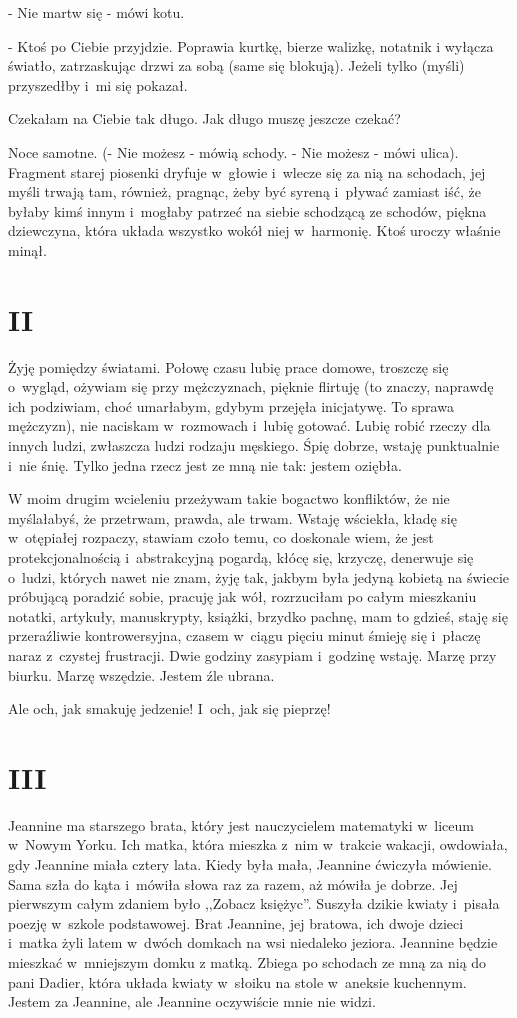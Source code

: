 \documentclass[oneside,polish,12pt,sfheadings]{mwbk}
\begin{document}
- Nie martw się - mówi kotu.

- Ktoś po Ciebie przyjdzie. Poprawia kurtkę, bierze walizkę, notatnik
i wyłącza światło, zatrzaskując drzwi za sobą (same się blokują).
Jeżeli tylko (myśli) przyszedłby i~mi się pokazał.

Czekałam na Ciebie tak długo. Jak długo muszę jeszcze czekać?

Noce samotne. (- Nie możesz - mówią schody. - Nie możesz - mówi ulica).
Fragment starej piosenki dryfuje w~głowie i~wlecze się za nią na schodach,
jej myśli trwają tam, również, pragnąc, żeby być syreną i~pływać zamiast
iść, że byłaby kimś innym i~mogłaby patrzeć na siebie schodzącą ze
schodów, piękna dziewczyna, która układa wszystko wokół niej w~harmonię.
Ktoś uroczy właśnie minął.

\chapter{II}

Żyję pomiędzy światami. Połowę czasu lubię prace domowe, troszczę
się o~wygląd, ożywiam się przy mężczyznach, pięknie flirtuję (to znaczy,
naprawdę ich podziwiam, choć umarłabym, gdybym przejęła inicjatywę.
To sprawa mężczyzn), nie naciskam w~rozmowach i~lubię gotować. Lubię
robić rzeczy dla innych ludzi, zwłaszcza ludzi rodzaju męskiego. Śpię
dobrze, wstaję punktualnie i~nie śnię. Tylko jedna rzecz jest ze mną
nie tak: jestem oziębła.

W moim drugim wcieleniu przeżywam takie bogactwo konfliktów, że nie
myślałabyś, że przetrwam, prawda, ale trwam. Wstaję wściekła, kładę
się w~otępiałej rozpaczy, stawiam czoło temu, co doskonale wiem, że
jest protekcjonalnością i~abstrakcyjną pogardą, kłócę się, krzyczę,
denerwuje się o~ludzi, których nawet nie znam, żyję tak, jakbym była
jedyną kobietą na świecie próbującą poradzić sobie, pracuję jak wół,
rozrzuciłam po całym mieszkaniu notatki, artykuły, manuskrypty, książki,
brzydko pachnę, mam to gdzieś, staję się przeraźliwie kontrowersyjna,
czasem w~ciągu pięciu minut śmieję się i~płaczę naraz z~czystej frustracji.
Dwie godziny zasypiam i~godzinę wstaję. Marzę przy biurku. Marzę wszędzie.
Jestem źle ubrana.

Ale och, jak smakuję jedzenie! I~och, jak się pieprzę!

\chapter{III}

Jeannine ma starszego brata, który jest nauczycielem matematyki w~liceum w~Nowym Yorku. Ich matka, która mieszka z~nim w~trakcie wakacji,
owdowiała, gdy Jeannine miała cztery lata. Kiedy była mała, Jeannine
ćwiczyła mówienie. Sama szła do kąta i~mówiła słowa raz za razem,
aż mówiła je dobrze. Jej pierwszym całym zdaniem było ,,Zobacz księżyc''.
Suszyła dzikie kwiaty i~pisała poezję w~szkole podstawowej. Brat Jeannine,
jej bratowa, ich dwoje dzieci i~matka żyli latem w~dwóch domkach na
wsi niedaleko jeziora. Jeannine będzie mieszkać w~mniejszym domku
z matką. Zbiega po schodach ze mną za nią do pani Dadier, która układa
kwiaty w~słoiku na stole w~aneksie kuchennym. Jestem za Jeannine,
ale Jeannine oczywiście mnie nie widzi.
\end{document}
